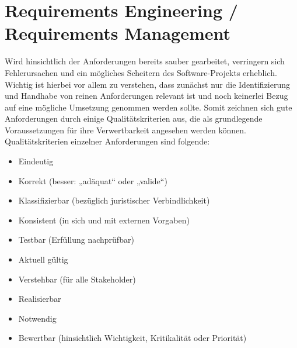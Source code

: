
\section{Requirements Engineering / Requirements Management}
Wird hinsichtlich der Anforderungen bereits sauber gearbeitet, verringern sich Fehlerursachen und ein mögliches Scheitern des Software-Projekts erheblich. Wichtig ist hierbei vor allem zu verstehen, dass zunächst nur die Identifizierung und Handhabe von reinen Anforderungen relevant ist und noch keinerlei Bezug auf eine mögliche Umsetzung genommen werden sollte. Somit zeichnen sich gute Anforderungen durch einige Qualitätskriterien aus, die als grundlegende Voraussetzungen für ihre Verwertbarkeit angesehen werden können. 
\\
Qualitätskriterien einzelner Anforderungen sind folgende:
\begin{itemize}
	\item Eindeutig
	\item Korrekt (besser: „adäquat“ oder „valide“)
	\item Klassifizierbar (bezüglich juristischer Verbindlichkeit)
	\item Konsistent (in sich und mit externen Vorgaben)
	\item Testbar (Erfüllung nachprüfbar)
	\item Aktuell gültig
	\item Verstehbar (für alle Stakeholder)
	\item Realisierbar
	\item Notwendig
	\item Bewertbar (hinsichtlich Wichtigkeit, Kritikalität oder Priorität)
\end{itemize}

